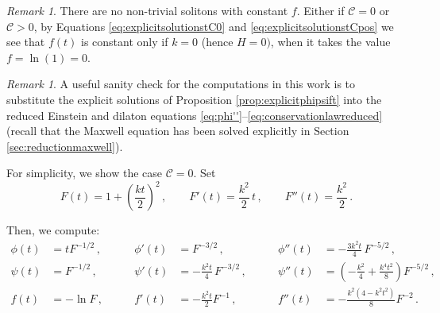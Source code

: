 \documentclass[12pt,a4paper,reqno]{amsart}
\theoremstyle{plain}
\theoremstyle{remark}
\newtheorem{remark}[theorem]{Remark}
\numberwithin{equation}{section}
\newcommand{\cC}{\mathcal{C}}
\begin{document}
\begin{remark}
There are no non-trivial solitons with constant $f$. Either if $\cC=0$ or $\cC>0$, by Equations \eqref{eq:explicitsolutionstC0} and \eqref{eq:explicitsolutionstCpos} we see that $f(t)$ is constant only if $k=0$ (hence $H=0)$, when it takes the value $f=\ln(1)=0$.
\end{remark}

\begin{remark}\label{rem:sanitycheck}
A useful sanity check for the computations in this work is to substitute the explicit solutions of Proposition \ref{prop:explicitphipsift} into the reduced Einstein and dilaton equations \eqref{eq:phi''}--\eqref{eq:conservationlawreduced} (recall that the Maxwell equation has been solved explicitly in Section \ref{sec:reductionmaxwell}).

For simplicity, we show the case $\cC=0$. Set
\begin{equation*}
F(t) = 1 + \left(\frac{kt}{2}\right)^2 \,, \qquad 
F'(t) = \frac{k^2}{2} \,t \,, \qquad 
F''(t) = \frac{k^2}{2} \,.
\end{equation*}

Then, we compute:
\begin{align*}
\phi(t) &= tF^{-1/2} \,, &\qquad 
\phi'(t) &= F^{-3/2} \,, &\qquad 
\phi''(t) &= - \frac{3k^2t}{4}\,F^{-5/2} \,, \\
\psi(t) &= F^{-1/2} \,, &\qquad 
\psi'(t) &= - \frac{k^2t}{4}\,F^{-3/2} \,, &\qquad 
\psi''(t) &= \left(-\frac{k^2}{4}+\frac{k^4t^2}{8}\right) F^{-5/2} \,, \\
f(t) &= - \ln F \,, &\qquad 
f'(t) &= - \frac{k^2t}{2}F^{-1} \,, &\qquad 
f''(t) &= - \frac{k^2(4-k^2t^2)}{8}F^{-2} \,.
\end{align*}


\end{remark}
\end{document}
